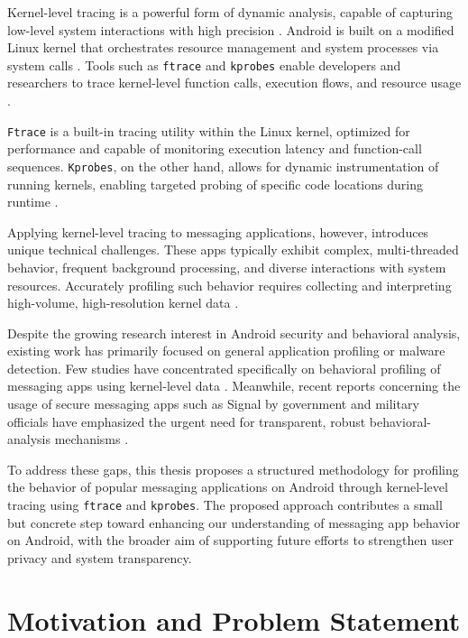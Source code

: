 \documentclass[a4paper,12pt]{report}
\begin{document}
Kernel-level tracing is a powerful form of dynamic analysis, capable of capturing
low-level system interactions with high precision \cite{BPFroid2021}. Android is built on a modified
Linux kernel that orchestrates resource management and system processes via
system calls \cite{AOSP2024Ftrace}. Tools such as \texttt{ftrace} and
\texttt{kprobes} enable developers and researchers to trace kernel-level function
calls, execution flows, and resource usage \cite{AOSP2024Ftrace,Kprobes2024}.

\texttt{Ftrace} is a built-in tracing utility within the Linux kernel, optimized
for performance and capable of monitoring execution latency and function-call
sequences. \texttt{Kprobes}, on the other hand, allows for dynamic instrumentation
of running kernels, enabling targeted probing of specific code locations during
runtime \cite{Kprobes2024}.

Applying kernel-level tracing to messaging applications, however, introduces
unique technical challenges. These apps typically exhibit complex,
multi-threaded behavior, frequent background processing, and diverse interactions
with system resources. Accurately profiling such behavior requires collecting and
interpreting high-volume, high-resolution kernel data \cite{BPFroid2021}.

Despite the growing research interest in Android security and behavioral
analysis, existing work has primarily focused on general application profiling or
malware detection. Few studies have concentrated specifically on behavioral
profiling of messaging apps using kernel-level data \cite{SLR2025Messaging}.
Meanwhile, recent reports concerning the usage of secure messaging apps such as
Signal by government and military officials have emphasized the urgent need for
transparent, robust behavioral-analysis mechanisms \cite{Politico2025Signal}.

To address these gaps, this thesis proposes a structured methodology for
profiling the behavior of popular messaging applications on Android through
kernel-level tracing using \texttt{ftrace} and \texttt{kprobes}. The proposed approach contributes a small but concrete step toward enhancing our understanding of messaging app behavior on Android, with the broader aim of supporting future efforts to strengthen user privacy and system transparency.

\section{Motivation and Problem Statement}
\end{document}
